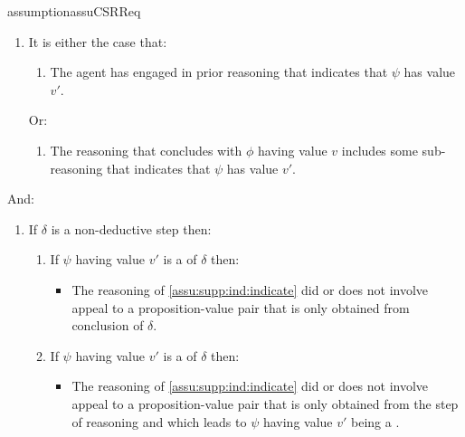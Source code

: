 \begin{note}
\begin{restatable}{assumption}{assuCSRReq}
    \begin{enumerate}[label=\arabic*., ref=(\arabic*)]
    \item
      \label{assu:supp:ind:indicate}
      It is either the case that:
      \begin{enumerate}[label=\alph*., ref=(\alph*)]
      \item
        The agent has engaged in prior reasoning that indicates that \(\psi\) has value \(v'\).
      \end{enumerate}
      Or:
      \begin{enumerate}[label=\alph*., ref=(\alph*), resume]
      \item
        The reasoning that concludes with \(\phi\) having value \(v\) includes some sub-reasoning that indicates that \(\psi\) has value \(v'\).
      \end{enumerate}
    \end{enumerate}
    And:
    \begin{enumerate}[label=\arabic*., ref=(\arabic*),resume]
    \item
      \label{assu:supp:ind:circular}
      If \(\delta\) is a non-deductive step then:
      \begin{enumerate}[label=\alph*., ref=(\alph*)]
      \item
        \label{assu:supp:ind:circular:p}
        If \(\psi\) having value \(v'\) is a \prequ{} of \(\delta\) then:
        \begin{itemize}
        \item
          The reasoning of \ref{assu:supp:ind:indicate} did or does not involve appeal to a proposition-value pair that is only obtained from conclusion of \(\delta\).
        \end{itemize}
      \item
        \label{assu:supp:ind:circular:cp}
        If \(\psi\) having value \(v'\) is  a \cprequ{} of \(\delta\) then:
        \begin{itemize}
        \item
          The reasoning of \ref{assu:supp:ind:indicate} did or does not involve appeal to a proposition-value pair that is only obtained from the step of reasoning and  which leads to \(\psi\) having value \(v'\) being a \prequ{}.
        \end{itemize}
      \end{enumerate}
    \end{enumerate}
    \vspace{-\baselineskip}
  \end{restatable}
\end{note}

